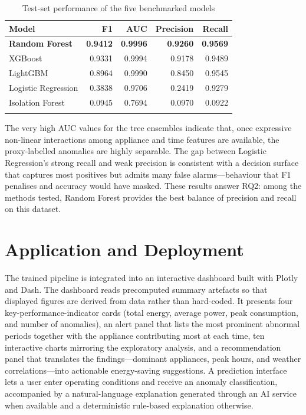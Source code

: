 \documentclass[pdflatex,sn-mathphys-num]{sn-jnl}%
\theoremstyle{thmstyleone}%
\theoremstyle{thmstyletwo}%
\theoremstyle{thmstylethree}%
\begin{document}
\begin{table}[h]
\caption{Test-set performance of the five benchmarked models}\label{tab:results}
\begin{tabular}{@{}lrrrr@{}}
\toprule
Model & F1 & AUC & Precision & Recall \\
\midrule
\textbf{Random Forest} & \textbf{0.9412} & \textbf{0.9996} & \textbf{0.9260} & \textbf{0.9569} \\
XGBoost            & 0.9331 & 0.9994 & 0.9178 & 0.9489 \\
LightGBM           & 0.8964 & 0.9990 & 0.8450 & 0.9545 \\
Logistic Regression & 0.3838 & 0.9706 & 0.2419 & 0.9279 \\
Isolation Forest    & 0.0945 & 0.7694 & 0.0970 & 0.0922 \\
\botrule
\end{tabular}
\end{table}

The very high AUC values for the tree ensembles indicate that, once expressive non-linear interactions among appliance and time features are available, the proxy-labelled anomalies are highly separable. The gap between Logistic Regression's strong recall and weak precision is consistent with a decision surface that captures most positives but admits many false alarms---behaviour that F1 penalises and accuracy would have masked. These results answer RQ2: among the methods tested, Random Forest provides the best balance of precision and recall on this dataset.

\section{Application and Deployment}\label{sec:app}

The trained pipeline is integrated into an interactive dashboard built with Plotly and Dash. The dashboard reads precomputed summary artefacts so that displayed figures are derived from data rather than hard-coded. It presents four key-performance-indicator cards (total energy, average power, peak consumption, and number of anomalies), an alert panel that lists the most prominent abnormal periods together with the appliance contributing most at each time, ten interactive charts mirroring the exploratory analysis, and a recommendation panel that translates the findings---dominant appliances, peak hours, and weather correlations---into actionable energy-saving suggestions. A prediction interface lets a user enter operating conditions and receive an anomaly classification, accompanied by a natural-language explanation generated through an AI service when available and a deterministic rule-based explanation otherwise.
\end{document}
